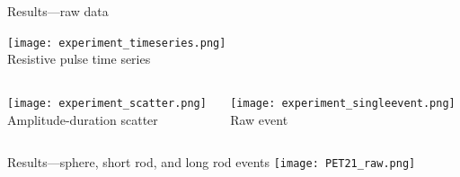 
\begin{frame}[c]{Results---raw data}

	{\centering
		\texttt{[image: experiment\_timeseries.png]} \\
		Resistive pulse time series \\
		\par
	}
	
	\begin{columns}[t]
		\begin{column}[T]{2.25in}
			{\centering
				\texttt{[image: experiment\_scatter.png]} \\
				Amplitude-duration scatter
				\par
			}
		\end{column}
		
		\begin{column}[T]{2.25in}
			{\centering
				\texttt{[image: experiment\_singleevent.png]} \\
				Raw event \\
				\par
			}
		\end{column}

	\end{columns}
	
\end{frame}






 
 \begin{frame}[c]{Results---sphere, short rod, and long rod events}
 	\texttt{[image: PET21\_raw.png]}
 \end{frame}

 
% 




